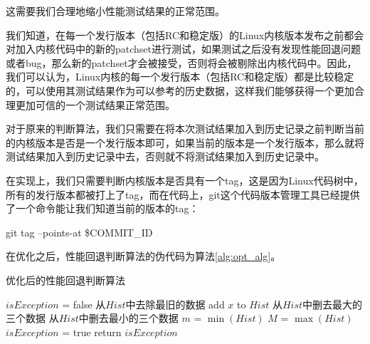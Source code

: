 这需要我们合理地缩小性能测试结果的正常范围。

我们知道，在每一个发行版本（包括RC和稳定版）的Linux内核版本发布之前都会对加入内核代码中的新的patchset进行测试，如果测试之后没有发现性能回退问题或者bug，那么新的patchset才会被接受，否则将会被剔除出内核代码中。因此，我们可以认为，Linux内核的每一个发行版本（包括RC和稳定版）都是比较稳定的，可以使用其测试结果作为可以参考的历史数据，这样我们能够获得一个更加合理更加可信的一个测试结果正常范围。


对于原来的判断算法，我们只需要在将本次测试结果加入到历史记录之前判断当前的内核版本是否是一个发行版本即可，如果当前的版本是一个发行版本，那么就将测试结果加入到历史记录中去，否则就不将测试结果加入到历史记录中。

在实现上，我们只需要判断内核版本是否具有一个tag，这是因为Linux代码树中，所有的发行版本都被打上了tag，而在代码上，git这个代码版本管理工具已经提供了一个命令能让我们知道当前的版本的tag：
\begin{center}
git tag --points-at \$COMMIT\_ID
\end{center}

在优化之后，性能回退判断算法的伪代码为算法\ref{alg:opt_alg}。


\begin{algorithm}
\caption{优化后的性能回退判断算法}
\label{alg:opt_alg}
$isException$ = false\;
{
	从$Hist$中去除最旧的数据\;
	add $x$ to $Hist$\;
}
从$Hist$中删去最大的三个数据\;
从$Hist$中删去最小的三个数据\;
$m$ = $\min(Hist)$\;
$M$ = $\max(Hist)$\;
{
	$isException$ = true\;
}
return $isException$\;
\end{algorithm}
